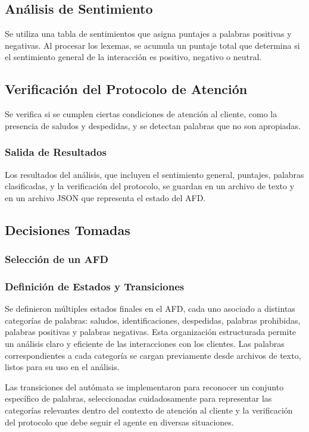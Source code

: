 \documentclass[12pt,a4paper]{article}
\begin{document}
\subsection{Análisis de Sentimiento}
Se utiliza una tabla de sentimientos que asigna puntajes a palabras positivas y negativas. Al
procesar los lexemas, se acumula un puntaje total que determina si el sentimiento general de la
interacción es positivo, negativo o neutral.

\subsection{Verificación del Protocolo de Atención}
Se verifica si se cumplen ciertas condiciones de atención al cliente, como la presencia de
saludos y despedidas, y se detectan palabras que no son apropiadas.

\subsubsection{Salida de Resultados}
Los resultados del análisis, que incluyen el sentimiento general, puntajes, palabras
clasificadas, y la verificación del protocolo, se guardan en un archivo de texto y en un
archivo JSON que representa el estado del AFD.

\subsection{Decisiones Tomadas}

\subsubsection{Selección de un AFD}

\subsubsection{Definición de Estados y Transiciones}
Se definieron múltiples estados finales en el AFD, cada uno asociado a distintas categorías de
palabras: saludos, identificaciones, despedidas, palabras prohibidas, palabras positivas y
palabras negativas. Esta organización estructurada permite un análisis claro y eficiente de las
interacciones con los clientes. Las palabras correspondientes a cada categoría se cargan
previamente desde archivos de texto, listos para su uso en el análisis.

Las transiciones del autómata se implementaron para reconocer un conjunto específico de
palabras, seleccionadas cuidadosamente para representar las categorías relevantes dentro del
contexto de atención al cliente y la verificación del protocolo que debe seguir el agente en
diversas situaciones.
\end{document}
